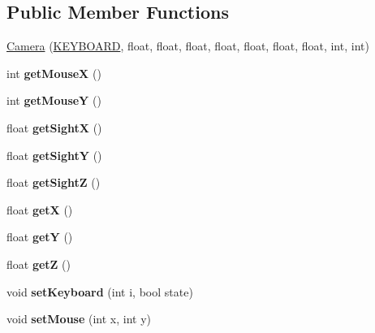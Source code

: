 \subsection*{Public Member Functions}
\begin{DoxyCompactItemize}
\item 
\hyperlink{class_camera_a09942dcf1bbcf89bbca39601b9f273be}{Camera} (\hyperlink{class_camera_a3ba12bb77fc0e6ce7048a7c03c7fa776}{K\+E\+Y\+B\+O\+A\+RD}, float, float, float, float, float, float, float, int, int)
\item 
\hypertarget{class_camera_a7bc94fe5b01cd16da44630bd64ec741f}{}\label{class_camera_a7bc94fe5b01cd16da44630bd64ec741f} 
int {\bfseries get\+MouseX} ()
\item 
\hypertarget{class_camera_a9f384f3c203241bf4008211a4664722f}{}\label{class_camera_a9f384f3c203241bf4008211a4664722f} 
int {\bfseries get\+MouseY} ()
\item 
\hypertarget{class_camera_a67b651e8e6e82483ac5b6bad6521412c}{}\label{class_camera_a67b651e8e6e82483ac5b6bad6521412c} 
float {\bfseries get\+SightX} ()
\item 
\hypertarget{class_camera_a1e460da4c97d1ea672263352fb643af4}{}\label{class_camera_a1e460da4c97d1ea672263352fb643af4} 
float {\bfseries get\+SightY} ()
\item 
\hypertarget{class_camera_af99fd2297879cac1096d890c037cc6ea}{}\label{class_camera_af99fd2297879cac1096d890c037cc6ea} 
float {\bfseries get\+SightZ} ()
\item 
\hypertarget{class_camera_ae7c46d026313f6faefdcfdb5094ea8cb}{}\label{class_camera_ae7c46d026313f6faefdcfdb5094ea8cb} 
float {\bfseries getX} ()
\item 
\hypertarget{class_camera_ad71d83315248602503546eba37697390}{}\label{class_camera_ad71d83315248602503546eba37697390} 
float {\bfseries getY} ()
\item 
\hypertarget{class_camera_ab85a0e157f20a818b29e3846d48d57a0}{}\label{class_camera_ab85a0e157f20a818b29e3846d48d57a0} 
float {\bfseries getZ} ()
\item 
\hypertarget{class_camera_a2dd502092835ca1fed314f7460b35a6e}{}\label{class_camera_a2dd502092835ca1fed314f7460b35a6e} 
void {\bfseries set\+Keyboard} (int i, bool state)
\item 
\hypertarget{class_camera_ac513682c4665c0f0ee87c29da8926544}{}\label{class_camera_ac513682c4665c0f0ee87c29da8926544} 
void {\bfseries set\+Mouse} (int x, int y)
\item 
\hypertarget{class_camera_ab9a63c5ca87cd0c25b3efc21a941c7b9}{}\label{class_camera_ab9a63c5ca87cd0c25b3efc21a941c7b9} 

\end{DoxyCompactItemize}

